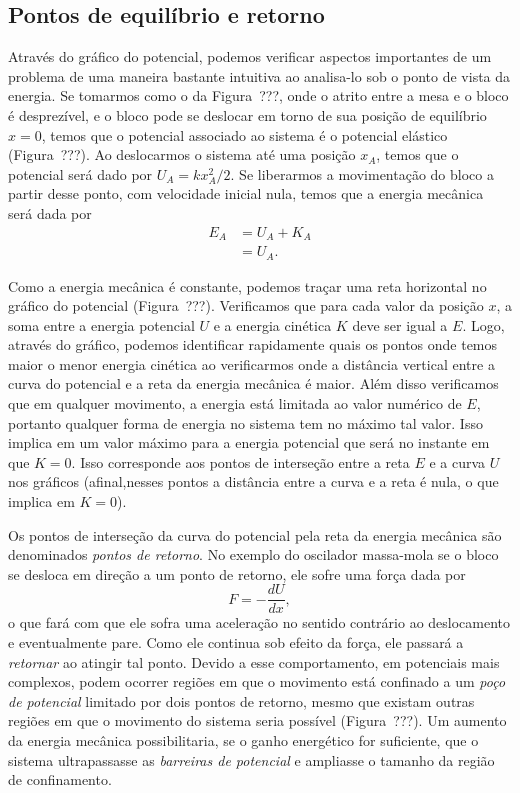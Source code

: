 \subsection{Pontos de equilíbrio e retorno}

Através do gráfico do potencial, podemos verificar aspectos importantes de um problema de uma maneira bastante intuitiva ao analisa-lo sob o ponto de vista da energia. Se tomarmos como o da Figura~???, onde o atrito entre a mesa e o bloco é desprezível, e o bloco pode se deslocar em torno de sua posição de equilíbrio $x = 0$, temos que o potencial associado ao sistema é o potencial elástico (Figura~???). Ao deslocarmos o sistema até uma posição $x_A$, temos que o potencial será dado por $U_A = kx_A^2 /2$. Se liberarmos a movimentação do bloco a partir desse ponto, com velocidade inicial nula, temos que a energia mecânica será dada por
\begin{align}
  E_A &= U_A + K_A \\
  &= U_A.
\end{align}

Como a energia mecânica é constante, podemos traçar uma reta horizontal no gráfico do potencial (Figura~???). Verificamos que para cada valor da posição $x$, a soma entre a energia potencial $U$ e a energia cinética $K$ deve ser igual a $E$. Logo, através do gráfico, podemos identificar rapidamente quais os pontos onde temos maior o menor energia cinética ao verificarmos onde a distância vertical entre a curva do potencial e a reta da energia mecânica é maior. Além disso verificamos que em qualquer movimento, a energia está limitada ao valor numérico de $E$, portanto qualquer forma de energia no sistema tem no máximo tal valor. Isso implica em um valor máximo para a energia potencial que será no instante em que $K = 0$. Isso corresponde aos pontos de interseção entre a reta $E$ e a curva $U$ nos gráficos (afinal,nesses pontos a distância entre a curva e a reta é nula, o que implica em $K=0$).

Os pontos de interseção da curva do potencial pela reta da energia mecânica são denominados \emph{pontos de retorno}. No exemplo do oscilador massa-mola se o bloco se desloca em direção a um ponto de retorno, ele sofre uma força dada por
\begin{equation}
  F = -\frac{dU}{dx},
\end{equation}
%
o que fará com que ele sofra uma aceleração no sentido contrário ao deslocamento e eventualmente pare. Como ele continua sob efeito da força, ele passará a \emph{retornar} ao atingir tal ponto. Devido a esse comportamento, em potenciais mais complexos, podem ocorrer regiões em que o movimento está confinado a um \emph{poço de potencial} limitado por dois pontos de retorno, mesmo que existam outras regiões em que o movimento do sistema seria possível (Figura~???). Um aumento da energia mecânica possibilitaria, se o ganho energético for suficiente, que o sistema ultrapassasse as \emph{barreiras de potencial} e ampliasse o tamanho da região de confinamento.


